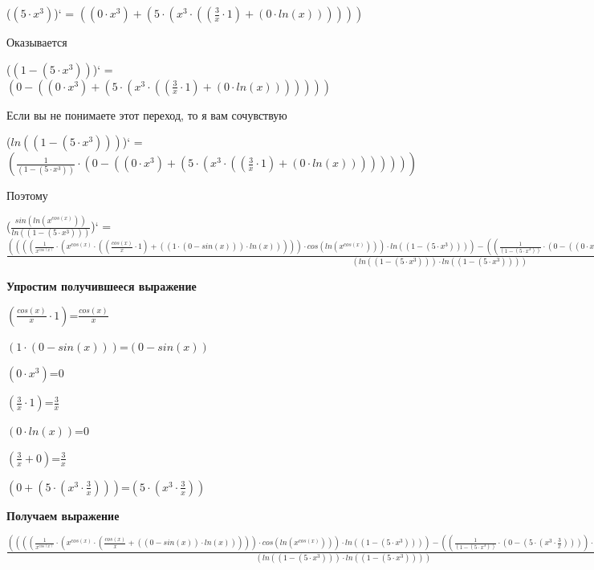 \documentclass[12pt,a4paper,fleqn]{article}
\begin{document}
\begin{center}
($(5 \cdot x^{3})$)`
 = $((0 \cdot x^{3}) + (5 \cdot (x^{3} \cdot ((\frac{3}{x} \cdot 1) + (0 \cdot ln(x))))))$\end{center}
Оказывается

\begin{center}
($(1 - (5 \cdot x^{3}))$)`
 = $(0 - ((0 \cdot x^{3}) + (5 \cdot (x^{3} \cdot ((\frac{3}{x} \cdot 1) + (0 \cdot ln(x)))))))$\end{center}
Если вы не понимаете этот переход, то я вам сочувствую

\begin{center}
($ln((1 - (5 \cdot x^{3})))$)`
 = $(\frac{1}{(1 - (5 \cdot x^{3}))} \cdot (0 - ((0 \cdot x^{3}) + (5 \cdot (x^{3} \cdot ((\frac{3}{x} \cdot 1) + (0 \cdot ln(x))))))))$\end{center}
Поэтому

\begin{center}
($\frac{sin(ln(x^{cos(x)}))}{ln((1 - (5 \cdot x^{3})))}$)`
 = $\frac{((((\frac{1}{x^{cos(x)}} \cdot (x^{cos(x)} \cdot ((\frac{cos(x)}{x} \cdot 1) + ((1 \cdot (0 - sin(x))) \cdot ln(x))))) \cdot cos(ln(x^{cos(x)}))) \cdot ln((1 - (5 \cdot x^{3})))) - ((\frac{1}{(1 - (5 \cdot x^{3}))} \cdot (0 - ((0 \cdot x^{3}) + (5 \cdot (x^{3} \cdot ((\frac{3}{x} \cdot 1) + (0 \cdot ln(x)))))))) \cdot sin(ln(x^{cos(x)}))))}{(ln((1 - (5 \cdot x^{3}))) \cdot ln((1 - (5 \cdot x^{3}))))}$\end{center}
\newpage \textbf{\LARGE Упростим получившееся выражение}

\begin{center}
$(\frac{cos(x)}{x} \cdot 1)$=$\frac{cos(x)}{x}$\end{center}
\begin{center}
$(1 \cdot (0 - sin(x)))$=$(0 - sin(x))$\end{center}
\begin{center}
$(0 \cdot x^{3})$=$0$\end{center}
\begin{center}
$(\frac{3}{x} \cdot 1)$=$\frac{3}{x}$\end{center}
\begin{center}
$(0 \cdot ln(x))$=$0$\end{center}
\begin{center}
$(\frac{3}{x} + 0)$=$\frac{3}{x}$\end{center}
\begin{center}
$(0 + (5 \cdot (x^{3} \cdot \frac{3}{x})))$=$(5 \cdot (x^{3} \cdot \frac{3}{x}))$\end{center}
\newpage \textbf{\Huge Получаем выражение}

$\frac{((((\frac{1}{x^{cos(x)}} \cdot (x^{cos(x)} \cdot (\frac{cos(x)}{x} + ((0 - sin(x)) \cdot ln(x))))) \cdot cos(ln(x^{cos(x)}))) \cdot ln((1 - (5 \cdot x^{3})))) - ((\frac{1}{(1 - (5 \cdot x^{3}))} \cdot (0 - (5 \cdot (x^{3} \cdot \frac{3}{x})))) \cdot sin(ln(x^{cos(x)}))))}{(ln((1 - (5 \cdot x^{3}))) \cdot ln((1 - (5 \cdot x^{3}))))}$
\end{document}
